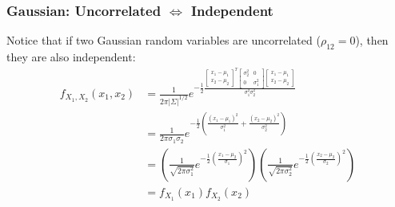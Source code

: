 \documentclass{beamer}
\begin{document}
\begin{frame}
  \frametitle{Gaussian: Uncorrelated $\Leftrightarrow$ Independent}

  Notice that if two Gaussian random variables are uncorrelated
  ($\rho_{12}=0$), then they are also independent:
  \begin{align*}
    f_{X_1,X_2}(x_1,x_2)
    &=\frac{1}{2\pi|\Sigma|^{1/2}}
    e^{-\frac{1}{2}
      \frac{\left[\begin{array}{c}x_1-\mu_1\\x_2-\mu_2\end{array}\right]^T
        \left[\begin{array}{cc}\sigma_2^2&0\\0&\sigma_1^2\end{array}\right]
        \left[\begin{array}{c}x_1-\mu_1\\x_2-\mu_2\end{array}\right]}
      {\sigma_1^2\sigma_2^2}}\\
    &=\frac{1}{2\pi\sigma_1\sigma_2}
    e^{-\frac{1}{2}\left(\frac{(x_1-\mu_1)^2}{\sigma_1^2}+\frac{(x_2-\mu_2)^2}{\sigma_2^2}\right)}\\
    &=\left(\frac{1}{\sqrt{2\pi\sigma_1^2}}e^{-\frac{1}{2}\left(\frac{x_1-\mu_2}{\sigma_1}\right)^2}\right)
    \left(\frac{1}{\sqrt{2\pi\sigma_2^2}}e^{-\frac{1}{2}\left(\frac{x_2-\mu_2}{\sigma_2}\right)^2}\right)
    \\
    &=f_{X_1}(x_1)f_{X_2}(x_2)
  \end{align*}
\end{frame}  
  
\end{document}
